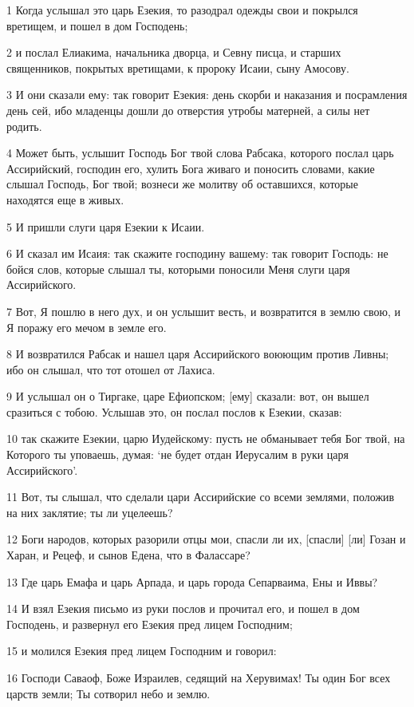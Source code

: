 \par 1 Когда услышал это царь Езекия, то разодрал одежды свои и покрылся вретищем, и пошел в дом Господень;
\par 2 и послал Елиакима, начальника дворца, и Севну писца, и старших священников, покрытых вретищами, к пророку Исаии, сыну Амосову.
\par 3 И они сказали ему: так говорит Езекия: день скорби и наказания и посрамления день сей, ибо младенцы дошли до отверстия утробы матерней, а силы нет родить.
\par 4 Может быть, услышит Господь Бог твой слова Рабсака, которого послал царь Ассирийский, господин его, хулить Бога живаго и поносить словами, какие слышал Господь, Бог твой; вознеси же молитву об оставшихся, которые находятся еще в живых.
\par 5 И пришли слуги царя Езекии к Исаии.
\par 6 И сказал им Исаия: так скажите господину вашему: так говорит Господь: не бойся слов, которые слышал ты, которыми поносили Меня слуги царя Ассирийского.
\par 7 Вот, Я пошлю в него дух, и он услышит весть, и возвратится в землю свою, и Я поражу его мечом в земле его.
\par 8 И возвратился Рабсак и нашел царя Ассирийского воюющим против Ливны; ибо он слышал, что тот отошел от Лахиса.
\par 9 И услышал он о Тиргаке, царе Ефиопском; [ему] сказали: вот, он вышел сразиться с тобою. Услышав это, он послал послов к Езекии, сказав:
\par 10 так скажите Езекии, царю Иудейскому: пусть не обманывает тебя Бог твой, на Которого ты уповаешь, думая: `не будет отдан Иерусалим в руки царя Ассирийского'.
\par 11 Вот, ты слышал, что сделали цари Ассирийские со всеми землями, положив на них заклятие; ты ли уцелеешь?
\par 12 Боги народов, которых разорили отцы мои, спасли ли их, [спасли] [ли] Гозан и Харан, и Рецеф, и сынов Едена, что в Фалассаре?
\par 13 Где царь Емафа и царь Арпада, и царь города Сепарваима, Ены и Иввы?
\par 14 И взял Езекия письмо из руки послов и прочитал его, и пошел в дом Господень, и развернул его Езекия пред лицем Господним;
\par 15 и молился Езекия пред лицем Господним и говорил:
\par 16 Господи Саваоф, Боже Израилев, седящий на Херувимах! Ты один Бог всех царств земли; Ты сотворил небо и землю.
